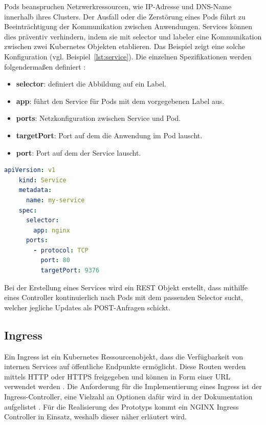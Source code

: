Pods beanspruchen Netzwerkressourcen, wie IP-Adresse und DNS-Name 
innerhalb ihres Clusters. Der Ausfall oder die Zerstörung eines Pods führt zu Beeinträchtigung der Kommunikation
zwischen Anwendungen. Services können dies präventiv verhindern, indem sie mit
selector und labeler eine Kommunikation zwischen zwei Kubernetes Objekten etablieren.
Das Beispiel zeigt eine solche Konfiguration (vgl. Beispiel~\ref{lst:service}). 
Die einzelnen Spezifikationen werden folgendermaßen definiert \cite{kubernetesservice}:

\begin{itemize}
  \item \textbf{selector}: definiert die Abbildung auf ein Label.
  \item \textbf{app}: führt den Service für Pods mit dem vorgegebenen Label aus.
  \item \textbf{ports}: Netzkonfiguration zwischen Service und Pod.
  \item \textbf{targetPort}: Port auf dem die Anwendung im Pod lauscht.
  \item \textbf{port}: Port auf dem der Service lauscht.
\end{itemize}

\begin{lstlisting}[caption={zum deutlicheren Verständnis mit dem deployment.yaml, leicht abgewandelte service.yaml \cite{kubernetesservice} },captionpos=b,label={lst:service},language=yaml]
    apiVersion: v1
    kind: Service
    metadata:
      name: my-service
    spec:
      selector:
        app: nginx
      ports:
        - protocol: TCP
          port: 80
          targetPort: 9376
    \end{lstlisting}

Bei der Erstellung eines Services wird ein REST Objekt erstellt, dass mithilfe eines Controller kontinuierlich 
nach Pods mit dem passenden Selector sucht, welcher jegliche Updates als POST-Anfragen schickt.


\subsection{Ingress}

Ein Ingress ist ein Kubernetes Ressourcenobjekt, dass die Verfügbarkeit von internen Services auf öffentliche Endpunkte ermöglicht.
Diese Routen werden mittels HTTP oder HTTPS freigegeben und können in Form einer URL verwendet werden \cite{kubernetesingress}.
Die Anforderung für die Implementierung eines Ingress ist der Ingress-Controller, eine Vielzahl an Optionen dafür wird in der 
Dokumentation aufgelistet \cite{kubernetesingresscontroller}. Für die Realisierung des Prototyps kommt ein NGINX Ingress Controller in Einsatz, weshalb
dieser näher erläutert wird.

